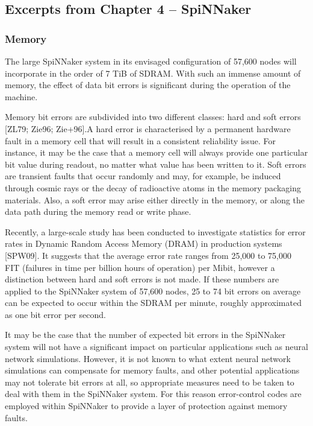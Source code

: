 \documentclass[a4paper, 11pt]{article}
\begin{document}
\newpage
\subsection{Excerpts from Chapter 4 -- SpiNNaker}
\subsubsection{Memory}
The large SpiNNaker system in its envisaged configuration of 57,600 nodes will incorporate in the order of 7 TiB of SDRAM. With such an immense amount of memory, the effect of data bit errors is significant during the operation of the machine.

Memory bit errors are subdivided into two different classes: hard and soft errors [ZL79; Zie96; Zie+96].A hard error is characterised by a permanent hardware fault in a memory cell that will result in a consistent reliability issue. For instance, it may be the case that a memory cell will always provide one particular bit value during readout, no matter what value has been written to it. Soft errors are transient faults that occur randomly and may, for example, be induced through cosmic rays or the decay of radioactive atoms in the memory packaging materials. Also, a soft error may arise either directly in the memory, or along the data path during the memory read or write phase.

Recently, a large-scale study has been conducted to investigate statistics for error rates in Dynamic Random Access Memory (DRAM) in production systems [SPW09]. It suggests that the average error rate ranges from 25,000 to 75,000 FIT (failures in time per billion hours of operation) per Mibit, however a distinction between hard and soft errors is not made. If these numbers are applied to the SpiNNaker system of 57,600 nodes, 25 to 74 bit errors on average can be expected to occur within the SDRAM per minute, roughly approximated as one bit error per second.

It may be the case that the number of expected bit errors in the SpiNNaker system will not have a significant impact on particular applications such as neural network simulations. However, it is not known to what extent neural network simulations can compensate for memory faults, and other potential applications may not tolerate bit errors at all, so appropriate measures need to be taken to deal with them in the SpiNNaker system. For this reason error-control codes are employed within SpiNNaker to provide a layer of protection against memory faults.
\end{document}
